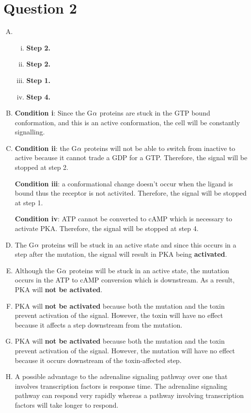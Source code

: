 \documentclass{article}
\begin{document}
\section*{Question 2}

\begin{enumerate}[A.]
    \item
        \begin{enumerate}[i.]
            \item \textbf{Step 2.}
            \item \textbf{Step 2.}
            \item \textbf{Step 1.}
            \item \textbf{Step 4.}
        \end{enumerate}
    \item \textbf{Condition i}: Since the G$\rm{\alpha}$ proteins are stuck in
        the GTP bound conformation, and this is an active conformation, the cell
        will be constantly signalling.
    \item \textbf{Condition ii}: the G$\rm{\alpha}$ proteins will not be able to
        switch from inactive to active because it cannot trade a GDP for a GTP.
        Therefore, the signal will be stopped at step 2. 
        
        \textbf{Condition iii}: a conformational change doesn't occur when the
        ligand is bound thus the receptor is not activited. Therefore, the
        signal will be stopped at step 1. 
        
        \textbf{Condition iv}: ATP cannot be converted to cAMP which is
        necessary to activate PKA. Therefore, the signal will be stopped at step
        4.
    \item The G$\rm{\alpha}$ proteins will be stuck in an active state and since
        this occurs in a step after the mutation, the signal will result in PKA
        being \textbf{activated}.
    \item Although the G$\rm{\alpha}$ proteins will be stuck in an active state,
        the mutation occurs in the ATP to cAMP conversion which is downstream.
        As a result, PKA will \textbf{not be activated}.
    \item PKA will \textbf{not be activated} because both the mutation and the
        toxin prevent activation of the signal. However, the toxin will have no
        effect because it affects a step downstream from the mutation.
    \item PKA will \textbf{not be activated} because both the mutation and the
        toxin prevent activation of the signal. However, the mutation will have
        no effect because it occurs downstream of the toxin-affected step.
    \item A possible advantage to the adrenaline signaling pathway over one that
        involves transcription factors is response time. The adrenaline
        signaling pathway can respond very rapidly whereas a pathway involving
        transcription factors will take longer to respond.
\end{enumerate}
\end{document}

